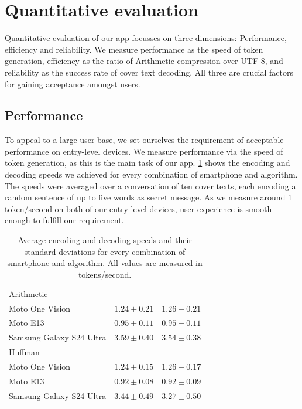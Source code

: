 \section{Quantitative evaluation}
\label{sec:quantitativeEvaluation}
Quantitative evaluation of our app focusses on three dimensions: Performance, efficiency and reliability. We measure performance as the speed of token generation, efficiency as the ratio of Arithmetic compression over UTF-8, and reliability as the success rate of cover text decoding. All three are crucial factors for gaining acceptance amongst users.

\subsection{Performance}
\label{sec:performance}
To appeal to a large user base, we set ourselves the requirement of acceptable performance on entry-level devices. We measure performance via the speed of token generation, as this is the main task of our app. \cref{tab:performance} shows the encoding and decoding speeds we achieved for every combination of smartphone and algorithm. The speeds were averaged over a conversation of ten cover texts, each encoding a random sentence of up to five words as secret message. As we measure around 1 token/second on both of our entry-level devices, user experience is smooth enough to fulfill our requirement.

\begin{table}
	\centering
	\begin{tabular}{@{} lrr @{}} %
		\toprule
		\tableheadline{Device} & \tableheadline{Encoding} & \tableheadline{Decoding} \\
		\midrule
		Arithmetic               &                 &                 \\
		\midrule
		Moto One Vision          & $1.24 \pm 0.21$ & $1.26 \pm 0.21$ \\
		Moto E13                 & $0.95 \pm 0.11$ & $0.95 \pm 0.11$ \\
		Samsung Galaxy S24 Ultra & $3.59 \pm 0.40$ & $3.54 \pm 0.38$ \\
		\midrule
		Huffman                  &                 &                 \\
		\midrule
		Moto One Vision          & $1.24 \pm 0.15$ & $1.26 \pm 0.17$ \\
		Moto E13                 & $0.92 \pm 0.08$ & $0.92 \pm 0.09$ \\
		Samsung Galaxy S24 Ultra & $3.44 \pm 0.49$ & $3.27 \pm 0.50$ \\
		\bottomrule
	\end{tabular}
	\caption[Performance]{Average encoding and decoding speeds and their standard deviations for every combination of smartphone and algorithm. All values are measured in tokens/second.}
	\label{tab:performance}
\end{table}

